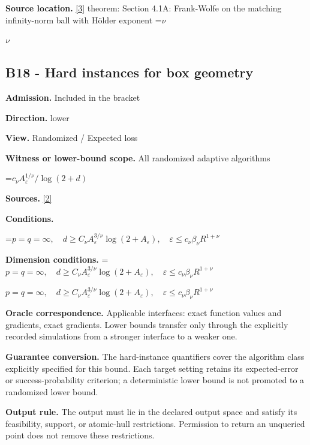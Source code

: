 \documentclass[10pt,a4paper]{article}
\newcommand{\AtlasMath}[1]{\par\begingroup\centering\setbox0=\hbox{$\displaystyle #1$}\ifdim\wd0>1.4\linewidth\typeout{ATLAS WIDE FORMULA: \the\wd0}\fi\ifdim\wd0>\linewidth\resizebox{\linewidth}{!}{\box0}\else\box0\fi\par\endgroup}
\newcommand{\AtlasInlineMath}[1]{\begingroup\setbox0=\hbox{$#1$}\ifdim\wd0>.4\linewidth\endgroup\AtlasMath{#1}\else\endgroup$#1$\fi}
\begin{document}
\textbf{Source location.} \href{https://arxiv.org/pdf/1307.5001}{[3]} theorem: Section 4.1A: Frank-Wolfe on the matching infinity-norm ball with Hölder exponent \AtlasInlineMath{\nu}



\subsection{B18 - Hard instances for box geometry}


\textbf{Admission.} Included in the bracket



\textbf{Direction.} lower



\textbf{View.} Randomized / Expected loss



\textbf{Witness or lower-bound scope.} All randomized adaptive algorithms



\AtlasMath{c_\nu A_\varepsilon^{1/\nu}/\log(2+d)}


\textbf{Sources.} \href{https://proceedings.mlr.press/v99/diakonikolas19c/diakonikolas19c.pdf}{[2]}



\textbf{Conditions.}
\AtlasMath{p=q=\infty,\quad d\ge C_\nu A_\varepsilon^{3/\nu}\log(2+A_\varepsilon),\quad\varepsilon\le c_\nu\beta_\nu R^{1+\nu}}




\textbf{Dimension conditions.} \AtlasInlineMath{p=q=\infty,\quad d\ge C_\nu A_\varepsilon^{3/\nu}\log(2+A_\varepsilon),\quad\varepsilon\le c_\nu\beta_\nu R^{1+\nu}}



\textbf{Oracle correspondence.} Applicable interfaces: exact function values and gradients, exact gradients. Lower bounds transfer only through the explicitly recorded simulations from a stronger interface to a weaker one.



\textbf{Guarantee conversion.} The hard-instance quantifiers cover the algorithm class explicitly specified for this bound. Each target setting retains its expected-error or success-probability criterion; a deterministic lower bound is not promoted to a randomized lower bound.



\textbf{Output rule.} The output must lie in the declared output space and satisfy its feasibility, support, or atomic-hull restrictions. Permission to return an unqueried point does not remove these restrictions.
\end{document}
